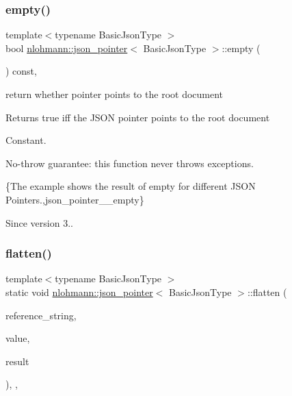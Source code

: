 \subsubsection{\texorpdfstring{empty()}{empty()}}
{\footnotesize\ttfamily template$<$typename Basic\+Json\+Type $>$ \\
bool \mbox{\hyperlink{classnlohmann_1_1json__pointer}{nlohmann\+::json\+\_\+pointer}}$<$ Basic\+Json\+Type $>$\+::empty (\begin{DoxyParamCaption}{ }\end{DoxyParamCaption}) const\hspace{0.3cm}{\ttfamily [inline]}, {\ttfamily [noexcept]}}



return whether pointer points to the root document 

\begin{DoxyReturn}{Returns}
true iff the J\+S\+ON pointer points to the root document
\end{DoxyReturn}
Constant.

No-\/throw guarantee\+: this function never throws exceptions.

\{The example shows the result of {\ttfamily empty} for different J\+S\+ON Pointers.,json\+\_\+pointer\+\_\+\+\_\+empty\}

\begin{DoxySince}{Since}
version 3.. 
\end{DoxySince}
\mbox{\label{classnlohmann_1_1json__pointer_ab0d7759d0caa6a0c0187916da28e6ee7}} 
\subsubsection{\texorpdfstring{flatten()}{flatten()}}
{\footnotesize\ttfamily template$<$typename Basic\+Json\+Type $>$ \\
static void \mbox{\hyperlink{classnlohmann_1_1json__pointer}{nlohmann\+::json\+\_\+pointer}}$<$ Basic\+Json\+Type $>$\+::flatten (\begin{DoxyParamCaption}\item[{const std\+::string \&}]{reference\+\_\+string,  }\item[{const Basic\+Json\+Type \&}]{value,  }\item[{Basic\+Json\+Type \&}]{result }\end{DoxyParamCaption})\hspace{0.3cm}{\ttfamily [inline]}, {\ttfamily [static]}, {\ttfamily [private]}}


